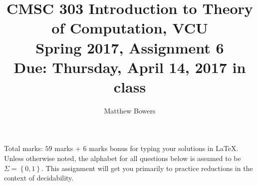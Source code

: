 \documentclass{article}
\author{Matthew Bowers}
\newcommand{\set}[1]{{\left\{#1\right\}}}    %
\begin{document}
\title{CMSC 303 Introduction to Theory of Computation, VCU\\Spring 2017, Assignment 6\\Due: Thursday, April 14, 2017 in class}
\date{}
\maketitle

\vspace{-5mm}
\noindent Total marks: $59$ marks + $6$ marks bonus for typing your solutions in LaTeX.\vspace{2mm}\\

\noindent Unless otherwise noted, the alphabet for all questions below is assumed to be $\Sigma=\set{0,1}$. This assignment will get you primarily to practice reductions in the context of decidability.
\end{document}
